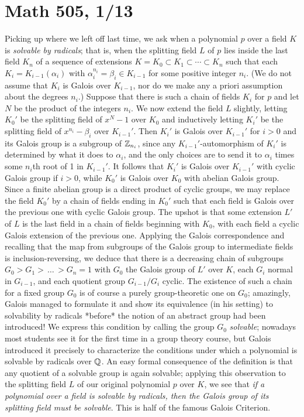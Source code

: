 \documentclass[10pt]{article}
\begin{document}
\section*{Math 505, 1/13}

Picking up where we left off last time, we ask when a polynomial $p$
over a field $K$ is {\sl solvable by radicals}; that is, when the
splitting field $L$ of $p$ lies inside the last field $K_n$ of a
sequence of extensions $K=K_0\subset K_1\subset\cdots\subset K_n$ such
that each $K_i = K_{i-1}(\alpha_i)$ with $\alpha_i^{n_i}=\beta_i\in
K_{i-1}$ for some positive integer $n_i$. (We do not assume that $K_i$
is Galois over $K_{i-1}$, nor do we make any a priori assumption about
the degrees $n_i$.) Suppose that there is such a chain of fields $K_i$
for $p$ and let $N$ be the product of the integers $n_i$. We now extend
the field $L$ slightly, letting $K_0'$ be the splitting field of $x^N -
1$ over $K_0$ and inductively letting $K_i'$ be the splitting field of
$x^{n_i} - \beta_i$ over $K_{i-1}'$. Then $K_i'$ is Galois over
$K_{i-1}'$ for $i>0$ and its Galois group is a subgroup of $\Bbb
Z_{n_i}$, since any $K_{i-1}'$-automorphism of $K_i'$ is determined by
what it does to $\alpha_i$, and the only choices are to send it to
$\alpha_i$ times some $n_i$th root of 1 in $K_{i-1}'$. It follows that
$K_i'$ is Galois over $K_{i-1}'$ with cyclic Galois group if $i>0$,
while $K_0'$ is Galois over $K_0$ with abelian Galois group. Since a
finite abelian group is a direct product of cyclic groups, we may
replace the field $K_0'$ by a chain of fields ending in $K_0'$ such that
each field is Galois over the previous one with cyclic Galois group. The
upshot is that some extension $L'$ of $L$ is the last field in a chain
of fields beginning with $K_0$, with each field a cyclic Galois
extension of the previous one. Applying the Galois correspondence and
recalling that the map from subgroups of the Galois group to
intermediate fields is inclusion-reversing, we deduce that there is a
decreasing chain of subgroups $G_0 > G_1 >\,\ldots\,> G_n = 1$ with
$G_0$ the Galois group of $L'$ over $K$, each $G_i$ normal in $G_{i-1}$,
and each quotient group $G_{i-1}/G_i$ cyclic. The existence of such a
chain for a fixed group $G_0$ is of course a purely group-theoretic one
on $G_0$; amazingly, Galois managed to formulate it and show its
equivalence (in his setting) to solvability by radicals *before* the
notion of an abstract group had been introduced! We express this
condition by calling the group $G_0$ {\sl solvable}; nowadays most
students see it for the first time in a group theory course, but Galois
introduced it precisely to characterize the conditions under which a
polynomial is solvable by radicals over $\Bbb Q$. An easy formal
consequence of the definition is that any quotient of a solvable group
is again solvable; applying this observation to the splitting field $L$
of our original polynomial $p$ over $K$, we see that {\sl if a
  polynomial over a field is solvable by radicals, then the Galois group
  of its splitting field must be solvable}. This is half of the famous
Galois Criterion.
\end{document}
